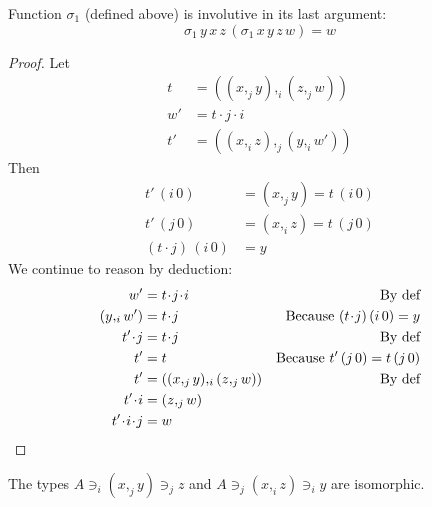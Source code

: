 \documentclass[english]{PaperTools/latex/lipics}
\newcommand\CP[3]{(#2,_{#1} #3)}
\newcommand\param[1]{\!\cdot\!#1}
\newcommand\op[1]{∋_{#1}}
\newcommand\mor[2]{({#1}\,{#2})}
\newcommand\proj[2]{{#2}\,\mor{#1}0}
\newcommand\projp[2]{\proj{#1}{(#2)}}
\begin{document}
\begin{theorem}
  Function $\sigma_1$ (defined above) is involutive in its last argument:
  \[ \sigma_1\, y\, x\, z\, (\sigma_1\, x\, y\, z\, w) = w \]
\end{theorem}
\begin{proof}
  Let
  \begin{align*}
    t &= \CP i {\CP j x y}{\CP j z w} \\
    w' &= t \param j \param i \\
    t' &= \CP j {\CP i x z}{\CP i y {w'}}
  \end{align*}
  Then
  \begin{align*}
    \proj i {t'} &= \CP j x y = \proj i t \\
    \proj j {t'} &= \CP i x z = \proj j t \\
    \projp i {t\param j} &= y
  \end{align*}
We continue to reason by deduction:
  \begin{align*}
    w' &= t \param j \param i & \text{By def}\\
    {\CP i y {w'}} &= t\param j & \text{Because $\projp i {t\param j} = y $}  \\
    t'\param j &= t\param j & \text{By def}\\
    t' &= t &\text{Because $\proj j {t'} = \proj j t$} \\
    t' &= \CP i {\CP j x y} {\CP j z w} & \text{By def} \\
    t'\param i &= \CP j z w \\
    t'\param i\param j &= w
  \qedhere
  \end{align*}
\end{proof}
\begin{corollary}
  The types $A \op i \CP j x y \op j z$ and $A \op j \CP i x z \op i y$ are isomorphic.
\end{corollary}
\end{document}
